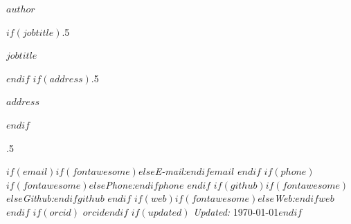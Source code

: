 
\centerline{\huge \bf $author$}

\vspace{2 mm}

\vspace{2 mm}

$if(jobtitle)$\moveleft.5\hoffset\centerline{$jobtitle$}$endif$
$if(address)$\moveleft.5\hoffset\centerline{$address$}$endif$

\vspace{1 mm}

\moveleft.5\hoffset\centerline{%
$if(email)$$if(fontawesome)$\faEnvelopeO \hspace{1 mm}$else$\emph{E-mail:}\hspace{1 mm}$endif$\href{mailto:$email$}{\tt $email$} \hspace{2 mm}$endif$%
$if(phone)$$if(fontawesome)$\faPhone \hspace{1 mm}$else$\emph{Phone:}\hspace{1 mm}$endif$$phone$ \hspace{2 mm}$endif$%
$if(github)$$if(fontawesome)$\faGithub \hspace{1 mm}$else$\emph{Github:}\hspace{1 mm}$endif$\href{https://github.com/$github$}{\tt $github$} \hspace{2 mm}$endif$%
$if(web)$$if(fontawesome)$\faGlobe \hspace{1 mm}$else$\emph{Web:}\hspace{1 mm}$endif$\href{https://$web$}{\tt $web$}$endif$%
$if(orcid)$ \hspace{2 mm}  {\tt $orcid$}$endif$%
$if(updated)$ \hspace{2 mm} \emph{Updated:} \today$endif$%
}

\vspace{0 mm}
\vspace{5pt}
